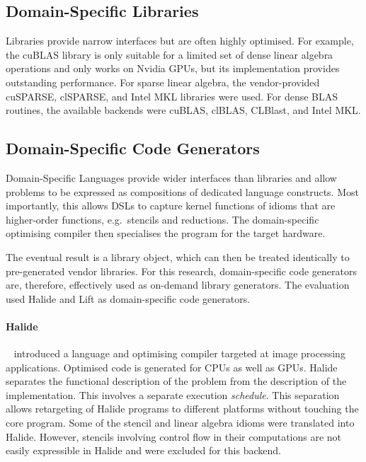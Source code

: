 \subsection{Domain-Specific Libraries}

    Libraries provide narrow interfaces but are often highly optimised.
    For example, the cuBLAS library is only suitable for a limited set of dense
    linear algebra operations and only works on Nvidia GPUs, but its
    implementation provides outstanding performance.
    For sparse linear algebra, the vendor-provided cuSPARSE, clSPARSE, and
    Intel MKL libraries were used.
    For dense BLAS routines, the available backends were cuBLAS, clBLAS,
    CLBlast, and Intel MKL.

\subsection{Domain-Specific Code Generators}

    Domain-Specific Languages provide wider interfaces than libraries and allow
    problems to be expressed as compositions of dedicated language constructs.
    Most importantly, this allows DSLs to capture kernel functions of idioms
    that are higher-order functions, e.g.\ stencils and reductions.
    The domain-specific optimising compiler then specialises the program for the
    target hardware.

    The eventual result is a library object, which can then be treated
    identically to pre-generated vendor libraries.
    For this research,  domain-specific code generators are, therefore,
    effectively used as on-demand library generators.
    The evaluation used Halide and Lift as domain-specific code generators.

    \paragraph*{Halide}~\citet{Ragan-Kelley2013Halide} introduced a language and
    optimising compiler targeted at image processing applications.
    Optimised code is generated for CPUs as well as GPUs.
    Halide separates the functional description of the problem from the
    description of the implementation.
    This involves a separate execution \emph{schedule}.
    This separation allows retargeting of Halide programs to different platforms
    without touching the core program.
    Some of the stencil and linear algebra idioms were translated into Halide.
    However, stencils involving control flow in their computations are not
    easily expressible in Halide and were excluded for this backend.


